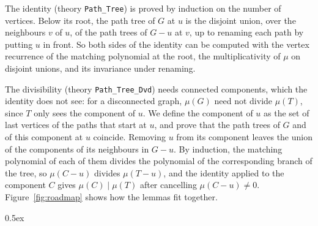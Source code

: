 \documentclass[10pt,a4paper]{article}
\begin{document}


The identity (theory \texttt{Path\_Tree}) is proved by induction on the number of vertices. Below its root, the path
tree of $G$ at $u$ is the disjoint union, over the neighbours $v$ of $u$, of the path trees of $G - u$ at $v$, up to
renaming each path by putting $u$ in front. So both sides of the identity can be computed with the vertex recurrence
of the matching polynomial at the root, the multiplicativity of $\mu$ on disjoint unions, and its invariance under
renaming.

The divisibility (theory \texttt{Path\_Tree\_Dvd}) needs connected components, which the identity does not see:
for a disconnected graph, $\mu(G)$ need not divide $\mu(T)$, since $T$ only sees the component of $u$. We define the
component of $u$ as the set of last vertices of the paths that start at $u$, and prove that the path trees of $G$ and
of this component at $u$ coincide. Removing $u$ from its component leaves the union of the components of its
neighbours in $G - u$. By induction, the matching polynomial of each of them divides the polynomial of the
corresponding branch of the tree, so $\mu(C - u)$ divides $\mu(T - u)$, and the identity applied to the component
$C$ gives $\mu(C) \mid \mu(T)$ after cancelling $\mu(C - u) \neq 0$. Figure~\ref{fig:roadmap} shows how the lemmas
fit together.



\parindent 0pt\parskip 0.5ex





\end{document}
